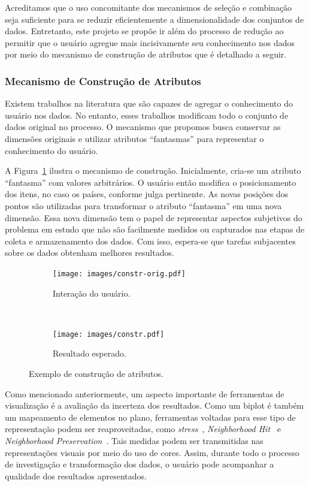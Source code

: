 Acreditamos que o uso concomitante dos mecanismos de seleção
e combinação seja suficiente para se reduzir
eficientemente a dimensionalidade dos conjuntos de dados.
Entretanto, este projeto se propõe ir além do processo de
redução ao permitir que o usuário agregue mais incisivamente
seu conhecimento nos dados por meio do mecanismo de
construção de atributos que é detalhado a seguir.

\subsubsection{Mecanismo de Construção de Atributos}

Existem trabalhos na literatura que são capazes de agregar
o conhecimento do usuário nos dados. No entanto, esses
trabalhos modificam todo o conjunto de dados original
no processo. O mecanismo que propomos busca conservar as dimensões
originais e utilizar atributos ``fantasmas'' para
representar o conhecimento do usuário.

A Figura~\ref{fig:constr} ilustra o mecanismo de construção.
Inicialmente, cria-se um atributo ``fantasma'' com valores
arbitrários. O usuário então modifica o posicionamento dos
itens, no caso os países, conforme julga pertinente. As
novas posições dos pontos são utilizadas para transformar o
atributo ``fantasma'' em uma nova dimensão. Essa nova
dimensão tem o papel de representar aspectos subjetivos do
problema em estudo que não são facilmente medidos ou
capturados nas etapas de coleta e armazenamento dos dados.
Com isso, espera-se que tarefas subjacentes sobre os dados
obtenham melhores resultados. 

\begin{figure}[h!]
  \centering
  \begin{subfigure}[b]{0.45\textwidth}
    \centering
    \texttt{[image: images/constr-orig.pdf]}
    \caption{Interação do usuário.}
  \end{subfigure}%
  ~
  \begin{subfigure}[b]{0.45\textwidth}
    \centering
    \texttt{[image: images/constr.pdf]}
    \caption{Resultado esperado.}
  \end{subfigure} 
  \caption{Exemplo de construção de atributos.}
  \label{fig:constr}
\end{figure}

Como mencionado anteriormente, um aspecto importante de
ferramentas de visualização é a avaliação da incerteza dos
resultados. Como um biplot é também um mapeamento de
elementos no plano, ferramentas voltadas para esse tipo de
representação podem ser reaproveitadas, como
\emph{stress}~\cite{Kruskal1964}, \emph{Neighborhood
Hit}~\cite{Paulovich2008} e \emph{Neighborhood
Preservation}~\cite{Paulovich2008a}. Tais medidas
podem ser transmitidas nas representações visuais por meio
do uso de cores. Assim, durante todo o processo de
investigação e transformação dos dados, o usuário 
pode acompanhar a qualidade dos resultados apresentados. 

